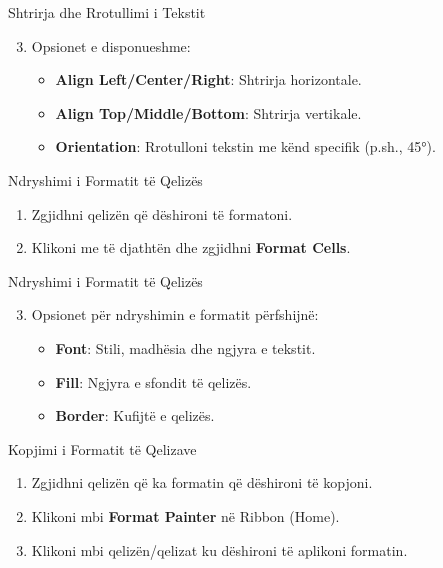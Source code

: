 \documentclass[
  ignorenonframetext,
]{beamer}
\begin{document}
\begin{frame}{Shtrirja dhe Rrotullimi i Tekstit}
\label{shtrirja-dhe-rrotullimi-i-tekstit-1}
\begin{enumerate}
\setcounter{enumi}{2}
\item
  Opsionet e disponueshme:

  \begin{itemize}
  \item
    \textbf{Align Left/Center/Right}: Shtrirja horizontale.
  \item
    \textbf{Align Top/Middle/Bottom}: Shtrirja vertikale.
  \item
    \textbf{Orientation}: Rrotulloni tekstin me kënd specifik (p.sh.,
    45°).
  \end{itemize}
\end{enumerate}
\end{frame}

\begin{frame}{Ndryshimi i Formatit të Qelizës}
\label{ndryshimi-i-formatit-tuxeb-qelizuxebs}
\begin{enumerate}
\item
  Zgjidhni qelizën që dëshironi të formatoni.
\item
  Klikoni me të djathtën dhe zgjidhni \textbf{Format Cells}.
\end{enumerate}
\end{frame}

\begin{frame}{Ndryshimi i Formatit të Qelizës}
\label{ndryshimi-i-formatit-tuxeb-qelizuxebs-1}
\begin{enumerate}
\setcounter{enumi}{2}
\item
  Opsionet për ndryshimin e formatit përfshijnë:

  \begin{itemize}
  \item
    \textbf{Font}: Stili, madhësia dhe ngjyra e tekstit.
  \item
    \textbf{Fill}: Ngjyra e sfondit të qelizës.
  \item
    \textbf{Border}: Kufijtë e qelizës.
  \end{itemize}
\end{enumerate}
\end{frame}

\begin{frame}{Kopjimi i Formatit të Qelizave}
\label{kopjimi-i-formatit-tuxeb-qelizave}
\begin{enumerate}
\item
  Zgjidhni qelizën që ka formatin që dëshironi të kopjoni.
\item
  Klikoni mbi \textbf{Format Painter} në Ribbon (Home).
\item
  Klikoni mbi qelizën/qelizat ku dëshironi të aplikoni formatin.
\end{enumerate}
\end{frame}
\end{document}
